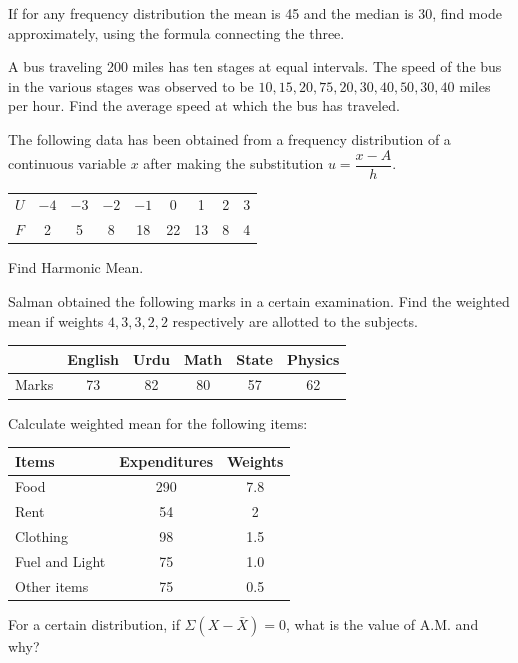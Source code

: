 \documentclass[11pt,a4paper]{article}
\begin{document}
\begin{longlist}
\item If for any frequency distribution the mean is 45 and the median is 30, find mode approximately, using the formula connecting the three.

\item A bus traveling 200 miles has ten stages at equal intervals. The speed of the bus in the various stages was observed to be $10,15,20,75,20,30,40,50,30,40$ miles per hour. Find the average speed at which the bus has traveled.

\item The following data has been obtained from a frequency distribution of a continuous variable $x$ after making the substitution $u=\dfrac{x-A}{h}$.
\begin{center}
\begin{tabular}{l|cccccccc}
$U$ & $-4$ & $-3$ & $-2$ & $-1$ & 0 & 1 & 2 & 3 \\
$F$ & 2 & 5 & 8 & 18 & 22 & 13 & 8 & 4
\end{tabular}
\end{center}
Find Harmonic Mean.

\item Salman obtained the following marks in a certain examination. Find the weighted mean if weights $4,3,3,2,2$ respectively are allotted to the subjects.
\begin{center}
\begin{tabular}{lccccc}
& English & Urdu & Math & State & Physics \\
\hline
Marks & 73 & 82 & 80 & 57 & 62
\end{tabular}
\end{center}

\item Calculate weighted mean for the following items:
\begin{center}
\begin{tabular}{lcc}
Items & Expenditures & Weights \\
\hline
Food & 290 & 7.8 \\
Rent & 54 & 2 \\
Clothing & 98 & 1.5 \\
Fuel and Light & 75 & 1.0 \\
Other items & 75 & 0.5
\end{tabular}
\end{center}

\item For a certain distribution, if $\Sigma(X-\bar{X})=0$, what is the value of A.M. and why?


\end{longlist}
\end{document}
